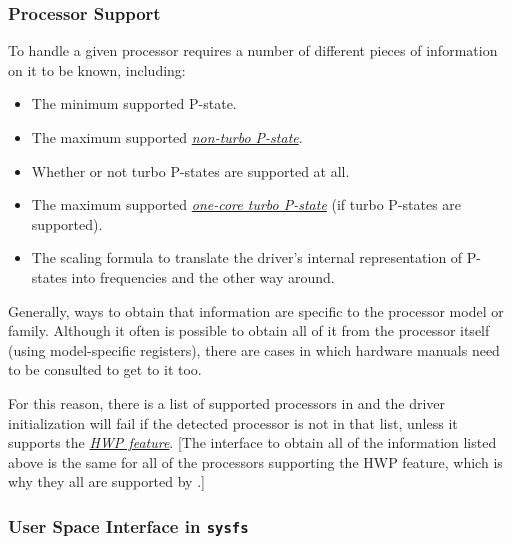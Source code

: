 \documentclass[a4paper,8pt,english]{sphinxmanual}
\begin{document}
\subsubsection{Processor Support}
\label{admin-guide/pm/intel_pstate:processor-support}
To handle a given processor  requires a number of different
pieces of information on it to be known, including:
\begin{itemize}
\item {} 
The minimum supported P-state.

\item {} 
The maximum supported {\hyperref[admin\string-guide/pm/intel_pstate:turbo]{\emph{non-turbo P-state}}}\label{admin-guide/pm/intel_pstate:turbo}.

\item {} 
Whether or not turbo P-states are supported at all.

\item {} 
The maximum supported {\hyperref[admin\string-guide/pm/intel_pstate:turbo]{\emph{one-core turbo P-state}}}\label{admin-guide/pm/intel_pstate:turbo} (if turbo P-states
are supported).

\item {} 
The scaling formula to translate the driver's internal representation
of P-states into frequencies and the other way around.

\end{itemize}

Generally, ways to obtain that information are specific to the processor model
or family.  Although it often is possible to obtain all of it from the processor
itself (using model-specific registers), there are cases in which hardware
manuals need to be consulted to get to it too.

For this reason, there is a list of supported processors in  and
the driver initialization will fail if the detected processor is not in that
list, unless it supports the {\hyperref[admin\string-guide/pm/intel_pstate:active\string-mode]{\emph{HWP feature}}}\label{admin-guide/pm/intel_pstate:active-mode}.  {[}The interface to
obtain all of the information listed above is the same for all of the processors
supporting the HWP feature, which is why they all are supported by
.{]}


\subsubsection{User Space Interface in \texttt{sysfs}}
\label{admin-guide/pm/intel_pstate:user-space-interface-in-sysfs}
\end{document}
